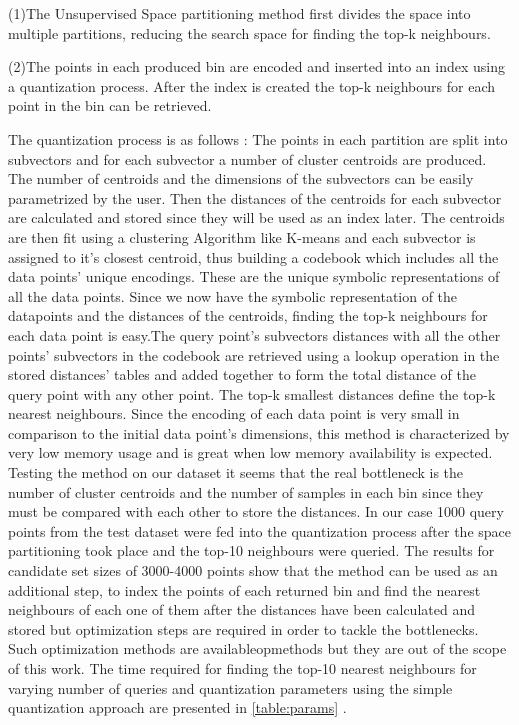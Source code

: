 \documentclass[sigconf, nonacm]{acmart}
\begin{document}
(1)The Unsupervised Space partitioning method first divides the space into multiple partitions, reducing the search space for finding the top-k neighbours.


(2)The points in each produced bin are encoded and inserted into an index using a quantization process. After the index is created the top-k neighbours for each point in the bin can be retrieved.

The quantization process is as follows : The points in each partition are split into subvectors and for each subvector a number of cluster centroids are produced. The number of centroids and the dimensions of the subvectors can be easily parametrized by the user. Then the distances of the centroids for each subvector are calculated and stored since they will be used as an index later. The centroids are then fit using a clustering Algorithm like K-means and each subvector is assigned to it's closest centroid, thus building a codebook which includes all the data points' unique encodings. These are the unique symbolic representations of all the data points. Since we now have the symbolic representation of the datapoints and the distances of the centroids, finding the top-k neighbours for each data point is easy.The query point's subvectors distances with all the other points' subvectors in the codebook are retrieved using a lookup operation in the stored distances' tables and added together to form the total distance of the query point with any other point. The top-k smallest distances define the top-k nearest neighbours. Since the encoding of each data point is very small in comparison to the initial data point's dimensions, this method is characterized by very low memory usage and is great when low memory availability is expected. Testing the method on our dataset it seems that the real bottleneck is the number of cluster centroids and the number of samples in each bin since they must be compared with each other to store the distances. In our case 1000 query points from the test dataset were fed into the quantization process after the space partitioning took place and the top-10 neighbours were queried. The results for candidate set sizes of 3000-4000 points show that the method can be used as an additional step, to index the points of each returned bin and find  the nearest neighbours of each one of them after the distances have been calculated and stored but optimization steps are required in order to tackle the bottlenecks. Such optimization methods are available\citep{opmethods}{opmethods} but they are out of the scope of this work. The time required for finding the top-10 nearest neighbours for varying number of queries and quantization parameters using the simple quantization approach are presented in \ref{table:params} .
\end{document}

